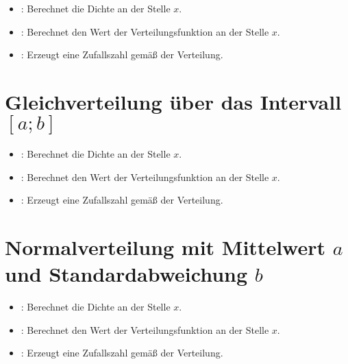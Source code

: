 \begin{itemize}

\item
{}:
Berechnet die Dichte an der Stelle $x$.

\item
{}:
Berechnet den Wert der Verteilungsfunktion an der Stelle $x$.

\item
{}:
Erzeugt eine Zufallszahl gemäß der Verteilung.

\end{itemize}



\section{Gleichverteilung über das Intervall \texorpdfstring{$[a;b]$}{[a;b]}}

\begin{itemize}

\item
{}:
Berechnet die Dichte an der Stelle $x$.

\item
{}:
Berechnet den Wert der Verteilungsfunktion an der Stelle $x$.

\item
{}:
Erzeugt eine Zufallszahl gemäß der Verteilung.

\end{itemize}



\section{Normalverteilung mit Mittelwert \texorpdfstring{$a$}{a} und Standardabweichung \texorpdfstring{$b$}{b}}

\begin{itemize}

\item
{}:
Berechnet die Dichte an der Stelle $x$.

\item
{}:
Berechnet den Wert der Verteilungsfunktion an der Stelle $x$.

\item
{}:
Erzeugt eine Zufallszahl gemäß der Verteilung.

\end{itemize}



